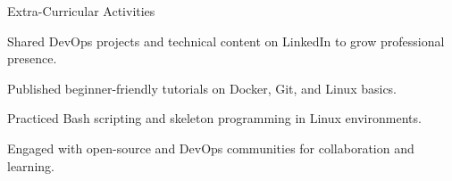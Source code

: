 \documentclass{resume}
\begin{document}

\begin{rSection}{Extra-Curricular Activities}
\item Shared DevOps projects and technical content on LinkedIn to grow professional presence.
\item Published beginner-friendly tutorials on Docker, Git, and Linux basics.
\item Practiced Bash scripting and skeleton programming in Linux environments.
\item Engaged with open-source and DevOps communities for collaboration and learning.
\end{rSection}
\end{document}
